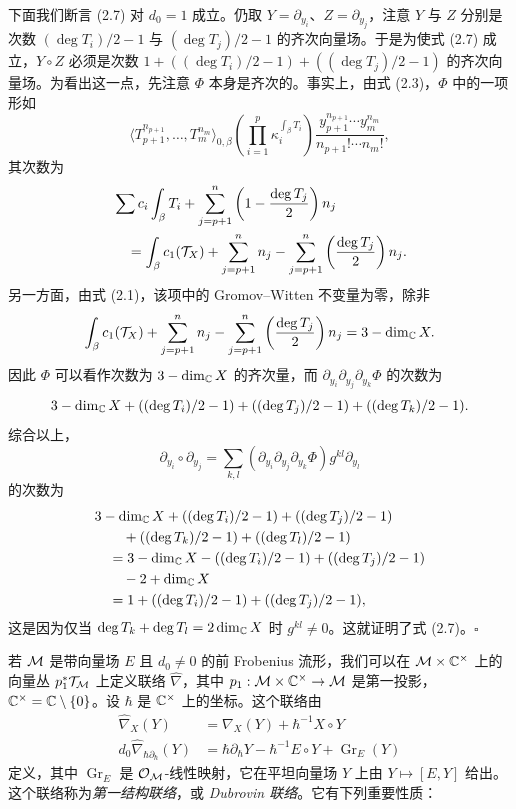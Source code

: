 \begin{example}
下面我们断言 (2.7) 对 $d_0=1$ 成立。仍取 $Y=\partial_{y_i}$、$Z=\partial_{y_j}$，注意 $Y$ 与 $Z$ 分别是次数 $(\deg T_i)/2-1$ 与 $(\deg T_j)/2-1$ 的齐次向量场。于是为使式 (2.7) 成立，$Y\circ Z$ 必须是次数 $1+((\deg T_i)/2-1)+((\deg T_j)/2-1)$ 的齐次向量场。为看出这一点，先注意 $\Phi$ 本身是齐次的。事实上，由式 (2.3)，$\Phi$ 中的一项形如
\[
\langle T_{p+1}^{n_{p+1}},\dots,T_m^{n_m}\rangle_{0,\beta}\left(\prod_{i=1}^{p}\kappa_i^{\int_{\beta}T_i}\right)\frac{y_{p+1}^{n_{p+1}}\cdots y_m^{n_m}}{n_{p+1}!\cdots n_m!},
\]
其次数为
\begin{align*}
&\sum c_i\int_{\beta}T_i+\sum_{j=p+1}^{n}\left(1-\frac{\deg T_j}{2}\right)n_j\\
&\quad=\int_{\beta}c_1(\mathcal{T}_X)+\sum_{j=p+1}^{n}n_j-\sum_{j=p+1}^{n}\left(\frac{\deg T_j}{2}\right)n_j.
\end{align*}
另一方面，由式 (2.1)，该项中的 Gromov–Witten 不变量为零，除非
\[
\int_{\beta}c_1(\mathcal{T}_X)+\sum_{j=p+1}^{n}n_j-\sum_{j=p+1}^{n}\left(\frac{\deg T_j}{2}\right)n_j=3-\dim_{\mathbb{C}}X.
\]
因此 $\Phi$ 可以看作次数为 $3-\dim_{\mathbb{C}}X$ 的齐次量，而 $\partial_{y_i}\partial_{y_j}\partial_{y_k}\Phi$ 的次数为
\[
3-\dim_{\mathbb{C}}X+((\deg T_i)/2-1)+((\deg T_j)/2-1)+((\deg T_k)/2-1).
\]
综合以上，
\[
\partial_{y_i}\circ\partial_{y_j}=\sum_{k,l}(\partial_{y_i}\partial_{y_j}\partial_{y_k}\Phi)g^{kl}\partial_{y_l}
\]
的次数为
\begin{align*}
&3-\dim_{\mathbb{C}}X+((\deg T_i)/2-1)+((\deg T_j)/2-1)\\
&\qquad+((\deg T_k)/2-1)+((\deg T_l)/2-1)\\
&\quad=3-\dim_{\mathbb{C}}X-((\deg T_i)/2-1)+((\deg T_j)/2-1)\\
&\qquad-2+\dim_{\mathbb{C}}X\\
&\quad=1+((\deg T_i)/2-1)+((\deg T_j)/2-1),
\end{align*}
这是因为仅当 $\deg T_k+\deg T_l=2\dim_{\mathbb{C}}X$ 时 $g^{kl}\neq 0$。这就证明了式 (2.7)。\hfill$\square$
\end{example}


若 $\mathcal{M}$ 是带向量场 $E$ 且 $d_0\neq 0$ 的前 Frobenius 流形，我们可以在 $\mathcal{M}\times\mathbb{C}^{\times}$ 上的向量丛 $p_1^{*}\mathcal{T}_{\mathcal{M}}$ 上定义联络 $\widehat\nabla$，其中 $p_1:\mathcal{M}\times\mathbb{C}^{\times}\to\mathcal{M}$ 是第一投影，$\mathbb{C}^{\times}=\mathbb{C}\setminus\{0\}$。设 $\hbar$ 是 $\mathbb{C}^{\times}$ 上的坐标。这个联络由
\begin{align*}
\widehat\nabla_X(Y)&=\nabla_X(Y)+\hbar^{-1}X\circ Y\\
d_0\widehat\nabla_{\hbar\partial_{\hbar}}(Y)&=\hbar\partial_{\hbar}Y-\hbar^{-1}E\circ Y+\operatorname{Gr}_E(Y)
\end{align*}
定义，其中 $\operatorname{Gr}_E$ 是 $\mathcal{O}_{\mathcal{M}}$-线性映射，它在平坦向量场 $Y$ 上由 $Y\mapsto[E,Y]$ 给出。这个联络称为\emph{第一结构联络}，或 \emph{Dubrovin 联络}。它有下列重要性质：

